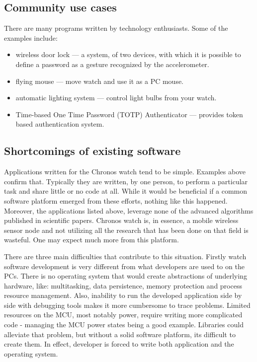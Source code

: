 \subsection{Community use cases}
There are many programs written by technology enthusiasts. Some of the
examples include:

\begin{itemize}
  \item wireless door lock --- a system, of two devices, with which it
    is possible to define a password as a gesture recognized by the
    accelerometer.
  \item flying mouse --- move watch and use it as a PC mouse.
  \item automatic lighting system --- control light bulbs from your
    watch.
  \item Time-based One Time Password (TOTP) Authenticator --- provides
    token based authentication system.
\end{itemize}

\subsection{Shortcomings of existing software}

Applications written for the Chronos watch tend to be simple. Examples
above confirm that. Typically they are written, by one person, to
perform a particular task and share little or no code at all.  While
it would be beneficial if a common software platform emerged from
these efforts, nothing like this happened. Moreover, the
applications listed above, leverage none of the advanced algorithms published in
scientific papers. Chronos watch is, in essence, a mobile wireless
sensor node and not utilizing all the research that has been done on
that field is wasteful. One may expect much more from this platform.

There are three main difficulties that contribute to this situation.
Firstly watch software development is very different from what
developers are used to on the PCs. There is no operating system that
would create abstractions of underlying hardware, like: multitasking,
data persistence, memory protection and process resource management.
Also, inability to run the developed application side by side with
debugging tools makes it more cumbersome to trace problems.  Limited
resources on the MCU, most notably power, require writing more
complicated code - managing the MCU power states being a good example.
Libraries could alleviate that problem, but without a solid software
platform, its difficult to create them. In effect, developer is forced
to write both application and the operating system.

